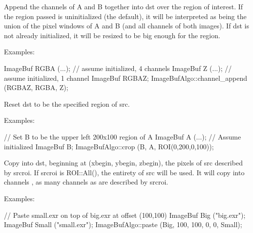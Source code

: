  
Append the channels of {\cf A} and {\cf B} together into {\cf dst} over
the region of interest.  If the region passed is uninitialized (the
default), it will be interpreted as being the union of the pixel windows
of {\cf A} and {\cf B} (and all channels of both images).  If {\cf dst}
is not already initialized, it will be resized to be big enough for the
region.

\smallskip
\noindent Examples:
\begin{code}
    ImageBuf RGBA (...);   // assume initialized, 4 channels
    ImageBuf Z (...);      // assume initialized, 1 channel
    ImageBuf RGBAZ;
    ImageBufAlgo::channel_append (RGBAZ, RGBA, Z);
\end{code}
\apiend


 
Reset {\cf dst} to be the specified region of {\cf src}.

\smallskip
\noindent Examples:
\begin{code}
    // Set B to be the upper left 200x100 region of A
    ImageBuf A (...);  // Assume initialized
    ImageBuf B;
    ImageBufAlgo::crop (B, A, ROI(0,200,0,100));
\end{code}
\apiend


 
Copy into {\cf dst}, beginning at {\cf (xbegin, ybegin, zbegin)}, the pixels of
{\cf src} described by {\cf srcroi}.  If {\cf srcroi} is {\cf ROI::All()},
the entirety of src will be used.  It will copy into channels 
{\cf [chbegin...]}, as many channels as are described by {\cf srcroi}.

\smallskip
\noindent Examples:
\begin{code}
    // Paste small.exr on top of big.exr at offset (100,100)
    ImageBuf Big ("big.exr");
    ImageBuf Small ("small.exr");
    ImageBufAlgo::paste (Big, 100, 100, 0, 0, Small);
\end{code}
\apiend


